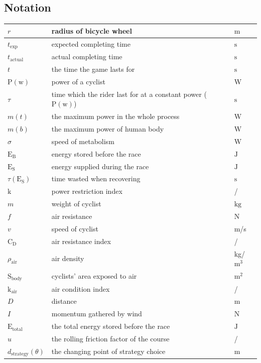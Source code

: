 \documentclass[12pt]{article}
\theoremstyle{definition}
\theoremstyle{remark}
\numberwithin{equation}{section}
\begin{document}
	\subsection{Notation}
	\begin{tabular}{|l|l|l|}
		\hline
		$r$&radius of bicycle wheel&$\mathrm{m}$\\
		\hline
		$t_\mathrm{exp}$&expected completing time&$\mathrm{s}$\\
		\hline
		$t_\mathrm{actual}$&actual completing time&$\mathrm{s}$\\
		\hline
		$t$&the time the game lasts for&$\mathrm{s}$\\
		\hline
		$\mathrm{P}(\mathrm{w})$&power of a cyclist&W\\
		\hline
		$\tau$&time which the rider last for at a constant power ($\mathrm{P}(\mathrm{w})$)&$\mathrm{s}$\\
		\hline
		$m(t)$&the maximum power in the whole process&$\mathrm{W}$\\
		\hline
		$m(b)$&the maximum power of human body&$\mathrm{W}$\\
		\hline
		$\sigma$&speed of metabolism&$\mathrm{W}$\\
		\hline
		$\mathrm{E}_\mathrm{B}$&energy stored before the race&$\mathrm{J}$\\
		\hline
		$\mathrm{E}_\mathrm{S}$&energy supplied during the race&$\mathrm{J}$\\
		\hline
		$\tau(\mathrm{E}_\mathrm{S})$&time wasted when recovering&$\mathrm{s}$\\
		\hline
		$\mathrm{k}$&power restriction index&/\\
		\hline
		$m$&weight of cyclist&$\mathrm{kg}$\\
		\hline
		$f$&air resistance&$\mathrm{N}$\\
		\hline
		$v$&speed of cyclist&m/s\\
		\hline
		$\mathrm{C}_\mathrm{D}$&air resistance index&/\\
		\hline
		$\rho_\mathrm{air}$&air density&kg/$\mathrm{m}^3$\\
		\hline
		$\mathrm{S}_\mathrm{body}$&cyclists' area exposed to air&$\mathrm{m}^2$\\
		\hline
		$\mathrm{k}_\mathrm{air}$&air condition index&/\\
		\hline
		$D$&distance&m\\
		\hline
		$I$&momentum gathered by wind&$\mathrm{N}$\\
		\hline
		$\mathrm{E}_\mathrm{total}$&the total energy stored before the race&$\mathrm{J}$\\
		\hline
		\(u\) & the rolling friction factor of the course & / \\
		\hline
		\(d_{\mathrm{strategy}}\left(\theta\right)\) & the changing point of strategy choice & \(\mathrm{m}\) \\
	 	\hline
	\end{tabular}
\end{document}
